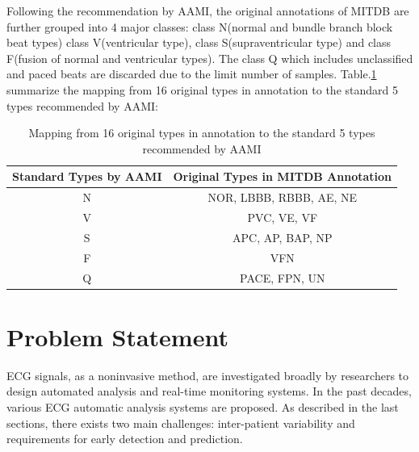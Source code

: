 Following the recommendation by AAMI, the original annotations of MITDB are further grouped into 4 major classes: class N(normal and bundle branch block beat types) class V(ventricular type), class S(supraventricular type) and class F(fusion of normal and ventricular types). The class Q which includes unclassified and paced beats are discarded due to the limit number of samples. Table.\ref{table:grouping_types} summarize the mapping from 16 original types in annotation to the standard 5 types recommended by AAMI:

\begin{table}[h]
\centering
\caption{Mapping from 16 original types in annotation to the standard 5 types recommended by AAMI}
\label{table:grouping_types}
\begin{tabular}{|c|c|}
\hline
Standard Types by AAMI & Original Types in MITDB Annotation \\ \hline
N                      & NOR, LBBB, RBBB, AE, NE            \\ \hline
V                      & PVC, VE, VF                        \\ \hline
S                      & APC, AP, BAP, NP                   \\ \hline
F                      & VFN                                \\ \hline
Q                      & PACE, FPN, UN                      \\ \hline
\end{tabular}
\end{table}




\section{Problem Statement}

ECG signals, as a noninvasive method, are investigated broadly by researchers to design automated analysis and real-time monitoring systems. In the past decades, various ECG automatic analysis systems are proposed. As described in the last sections, there exists two main challenges: inter-patient variability and requirements for early detection and prediction. %

